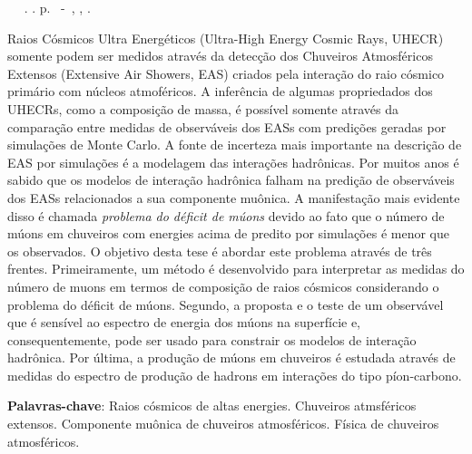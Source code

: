 \setlength{\absparsep}{18pt} %
\begin{resumo}[Resumo]
	\begin{flushleft} 
		        \setlength{\absparsep}{0pt} %
			\SingleSpacing 
			\imprimirautorabr~ ~\textbf{\imprimirtitleabstract}. \imprimirdata. \pageref{LastPage}p. 
			\imprimirtipotrabalho~-~\imprimirinstituicao, \imprimirlocal, \imprimirdata. 
 	\end{flushleft}
        \OnehalfSpacing 			

Raios C\'osmicos Ultra Energ\'eticos (Ultra-High Energy Cosmic Rays, UHECR) somente
podem ser medidos atrav\'es da detec\c{c}\~ao dos Chuveiros Atmosf\'ericos Extensos
(Extensive Air Showers, EAS) criados pela intera\c{c}\~ao do raio c\'osmico prim\'ario com
n\'ucleos atmof\'ericos. A infer\^encia de algumas propriedados dos UHECRs, como a composi\c{c}\~ao
de massa, \'e poss\'ivel somente atrav\'es da compara\c{c}\~ao entre medidas de observ\'aveis dos EASs
com predi\c{c}\~oes geradas por simula\c{c}\~oes de Monte Carlo. A fonte de incerteza mais importante
na descri\c{c}\~ao de EAS por simula\c{c}\~oes \'e a modelagem das intera\c{c}\~oes hadr\^onicas. Por muitos
anos \'e sabido que os modelos de intera\c{c}\~ao hadr\^onica falham na predi\c{c}\~ao de observ\'aveis
dos EASs relacionados a sua componente mu\^onica. A manifesta\c{c}\~ao mais evidente disso \'e 
chamada \emph{problema do d\'eficit de m\'uons} devido ao fato que o n\'umero de m\'uons em chuveiros
com energies acima de  predito por simula\c{c}\~oes \'e menor que os observados.
O objetivo desta tese \'e abordar este problema atrav\'es de tr\^es frentes. Primeiramente,
um m\'etodo \'e desenvolvido para interpretar as medidas do n\'umero de muons em termos
de composi\c{c}\~ao de raios c\'osmicos considerando o problema do d\'eficit de m\'uons.
Segundo, a proposta e o teste de um observ\'avel que \'e sens\'ivel ao espectro de energia dos m\'uons
na superf\'icie e, consequentemente, pode ser usado para constrair os modelos de intera\c{c}\~ao hadr\^onica.
Por \'ultima, a produ\c{c}\~ao de m\'uons em chuveiros \'e estudada atrav\'es
de medidas do espectro de produ\c{c}\~ao de hadrons em intera\c{c}\~oes do tipo p\'ion-carbono.



 \textbf{Palavras-chave}: Raios c\'osmicos de altas energies. Chuveiros atmsf\'ericos extensos. Componente mu\^onica de chuveiros atmosf\'ericos. F\'isica de chuveiros atmosf\'ericos.   
\end{resumo}
